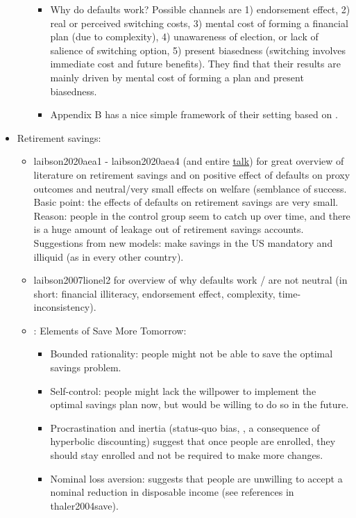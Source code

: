 \documentclass[a4paper, 11pt]{report}
\begin{document}
\begin{itemize}
\begin{itemize}
\begin{itemize}
			\item Why do defaults work? Possible channels are 1) endorsement effect, 2) real or perceived switching costs, 3) mental cost of forming a financial plan (due to complexity), 4) unawareness of election, or lack of salience of switching option, 5) present biasedness (switching involves immediate cost and future benefits). They find that their results are mainly driven by mental cost of forming a plan and present biasedness.

			\item Appendix B has a nice simple framework of their setting based on \citet{o1999doing}.
		\end{itemize}
	\end{itemize}


	\item Retirement savings:
	\begin{itemize}
		\item laibson2020aea1 - laibson2020aea4 (and entire \href{https://www.aeaweb.org/webcasts/2020/aea-afa-joint-luncheon-nudges-are-not-enough}{talk}) for great overview of literature on retirement savings and on positive effect of defaults on proxy outcomes and neutral/very small effects on welfare (semblance of success. Basic point: the effects of defaults on retirement savings are very small. Reason: people in the control group seem to catch up over time, and there is a huge amount of leakage out of retirement savings accounts. Suggestions from new models: make savings in the US mandatory and illiquid (as in every other country).

		\item laibson2007lionel2 for overview of why defaults work / are not neutral (in short: financial illiteracy, endorsement effect, complexity, time-inconsistency).

		\item \citet{thaler2004save}: Elements of Save More Tomorrow:
		\begin{itemize}
			\item Bounded rationality: people might not be able to save the optimal savings problem.
			\item Self-control: people might lack the willpower to implement the optimal savings plan now, but would be willing to do so in the future.
			\item Procrastination and inertia (status-quo bias, \citet{samuelson1988status}, a consequence of hyperbolic discounting) suggest that once people are enrolled, they should stay enrolled and not be required to make more changes.
			\item Nominal loss aversion: suggests that people are unwilling to accept a nominal reduction in disposable income (see references in thaler2004save).
		\end{itemize}


\end{itemize}
\end{itemize}
\end{document}
